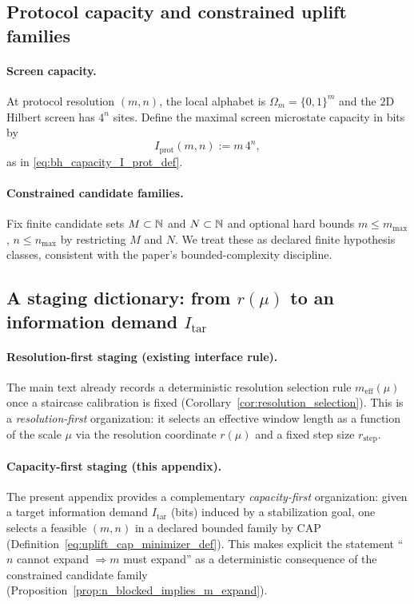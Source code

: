 \subsection{Protocol capacity and constrained uplift families}
\label{subsec:uplift_capacity_families}

\paragraph{Screen capacity.}
\InterfaceTag At protocol resolution $(m,n)$, the local alphabet is $\Omega_m=\{0,1\}^m$ and the $2$D Hilbert screen has $4^n$ sites.
Define the maximal screen microstate capacity in bits by
\begin{equation}\label{eq:uplift_I_prot_def}
I_{\mathrm{prot}}(m,n):=m\,4^n,
\end{equation}
as in \eqref{eq:bh_capacity_I_prot_def}.

\paragraph{Constrained candidate families.}
\AuditTag Fix finite candidate sets $M\subset\mathbb{N}$ and $N\subset\mathbb{N}$ and optional hard bounds $m\le m_{\max}$, $n\le n_{\max}$ by restricting $M$ and $N$.
We treat these as declared finite hypothesis classes, consistent with the paper's bounded-complexity discipline.

\subsection{A staging dictionary: from \texorpdfstring{$r(\mu)$}{r(mu)} to an information demand \texorpdfstring{$I_{\mathrm{tar}}$}{I_tar}}
\label{subsec:uplift_staging_dictionary}

\paragraph{Resolution-first staging (existing interface rule).}
\InterfaceTag The main text already records a deterministic resolution selection rule $m_{\mathrm{eff}}(\mu)$ once a staircase calibration is fixed (Corollary~\ref{cor:resolution_selection}).
This is a \emph{resolution-first} organization: it selects an effective window length as a function of the scale $\mu$ via the resolution coordinate $r(\mu)$ and a fixed step size $r_{\mathrm{step}}$.

\paragraph{Capacity-first staging (this appendix).}
\InterfaceTag The present appendix provides a complementary \emph{capacity-first} organization:
given a target information demand $I_{\mathrm{tar}}$ (bits) induced by a stabilization goal, one selects a feasible $(m,n)$ in a declared bounded family by CAP (Definition~\eqref{eq:uplift_cap_minimizer_def}).
This makes explicit the statement ``$n$ cannot expand $\Rightarrow m$ must expand'' as a deterministic consequence of the constrained candidate family (Proposition~\ref{prop:n_blocked_implies_m_expand}).

